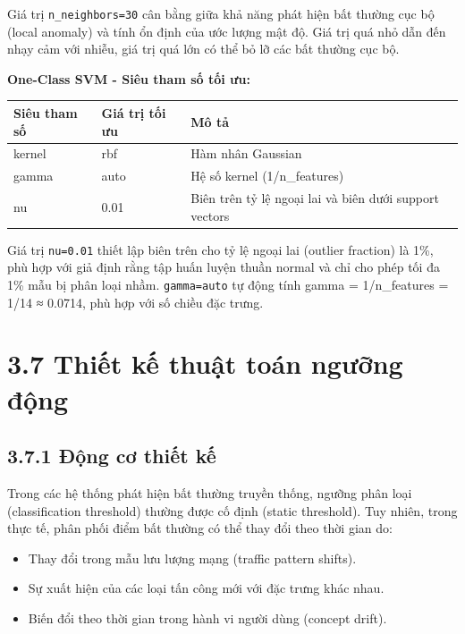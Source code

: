 \documentclass[
  a4paper]{report}
\newcounter{none} %
\providecommand{\tightlist}{%
  \setlength{\itemsep}{0pt}\setlength{\parskip}{0pt}}
\begin{document}
Giá trị \texttt{n\_neighbors=30} cân bằng giữa khả năng phát hiện bất
thường cục bộ (local anomaly) và tính ổn định của ước lượng mật độ. Giá
trị quá nhỏ dẫn đến nhạy cảm với nhiễu, giá trị quá lớn có thể bỏ lỡ các
bất thường cục bộ.

\textbf{One-Class SVM - Siêu tham số tối ưu:}

{\def\LTcaptype{none} %
\begin{longtable}[]{@{}lll@{}}
\toprule\noalign{}
Siêu tham số & Giá trị tối ưu & Mô tả \\
\midrule\noalign{}
\endhead
\bottomrule\noalign{}
\endlastfoot
kernel & rbf & Hàm nhân Gaussian \\
gamma & auto & Hệ số kernel (1/n\_features) \\
nu & 0.01 & Biên trên tỷ lệ ngoại lai và biên dưới support vectors \\
\end{longtable}
}

Giá trị \texttt{nu=0.01} thiết lập biên trên cho tỷ lệ ngoại lai
(outlier fraction) là 1\%, phù hợp với giả định rằng tập huấn luyện
thuần normal và chỉ cho phép tối đa 1\% mẫu bị phân loại nhầm.
\texttt{gamma=auto} tự động tính gamma = 1/n\_features = 1/14 ≈ 0.0714,
phù hợp với số chiều đặc trưng.

\section{3.7 Thiết kế thuật toán ngưỡng
động}\label{thiux1ebft-kux1ebf-thuux1eadt-touxe1n-ngux1b0ux1ee1ng-ux111ux1ed9ng}

\subsection{3.7.1 Động cơ thiết
kế}\label{ux111ux1ed9ng-cux1a1-thiux1ebft-kux1ebf}

Trong các hệ thống phát hiện bất thường truyền thống, ngưỡng phân loại
(classification threshold) thường được cố định (static threshold). Tuy
nhiên, trong thực tế, phân phối điểm bất thường có thể thay đổi theo
thời gian do:

\begin{itemize}
\tightlist
\item
  Thay đổi trong mẫu lưu lượng mạng (traffic pattern shifts).
\item
  Sự xuất hiện của các loại tấn công mới với đặc trưng khác nhau.
\item
  Biến đổi theo thời gian trong hành vi người dùng (concept drift).
\end{itemize}
\end{document}
